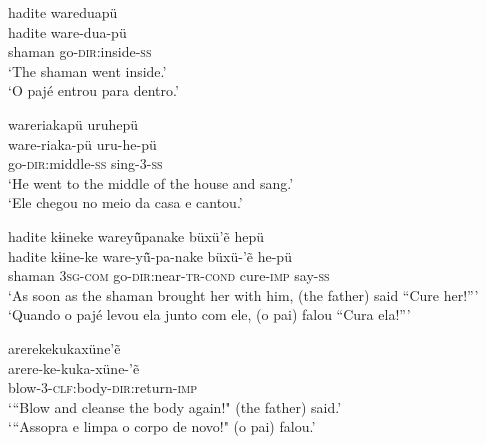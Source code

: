 \documentclass[output=paper,
modfonts,nonflat
]{langsci/langscibook}
\begin{document}
\ea    hadite wareduapü \\[.3em]
\gll 	hadite ware-dua-pü \\
shaman go-\textsc{dir}:inside-\textsc{ss}\\
\glt    `The shaman went inside.' \\
`O pajé entrou para dentro.'\\
\z


\ea     wareriakapü uruhepü \\[.3em]
\gll 	ware-riaka-pü uru-he-pü\\
go-\textsc{dir}:middle-\textsc{ss} sing-3-\textsc{ss}\\
\glt    `He went to the middle of the house and sang.'\\
`Ele chegou no meio da casa e cantou.'\\
\z

\ea   hadite kɨineke wareyü̃panake büxü'ẽ hepü \\[.3em]
\gll 	hadite kɨine-ke ware-yü̃-pa-nake büxü-'ẽ he-pü\\
shaman \textsc{3sg-com} go-\textsc{dir}:near-\textsc{tr-cond} cure-\textsc{imp} say-\textsc{ss} \\
\glt   `As soon as the shaman brought her with him, (the father) said ``Cure her!{''}' \\
`Quando o pajé levou ela junto com ele, (o pai) falou ``Cura ela!{''}'
\z

\ea     arerekekukaxüne'ẽ \\[.3em]
\gll 	arere-ke-kuka-xüne-'ẽ \\
blow-\textsc{3}-\textsc{clf}:body-\textsc{dir}:return-\textsc{imp} \\
\glt    `{``}Blow and cleanse the body again!" (the father) said.' \\
`{``}Assopra e limpa o corpo de novo!" (o pai) falou.' \\
\z
\end{document}
